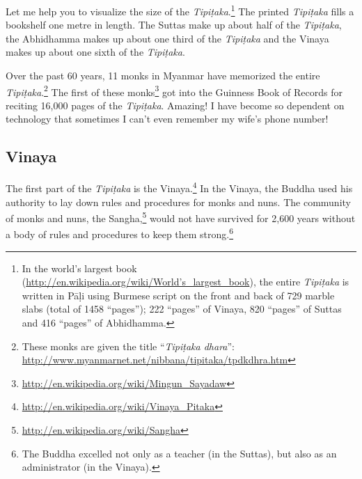 Let me help you to visualize the size of the \textit{Tipiṭaka}.\footnote{In the world’s largest book (\url{http://en.wikipedia.org/wiki/World’s_largest_book}), the entire \textit{Tipiṭaka} is written in Pāḷi using Burmese script on the front and back of 729 marble slabs (total of 1458 “pages”); 222 “pages” of Vinaya, 820 “pages” of Suttas and 416 “pages” of Abhidhamma.} The printed \textit{Tipiṭaka} fills a bookshelf one metre in length. The Suttas make up about half of the \textit{Tipiṭaka}, the Abhidhamma makes up about one third of the \textit{Tipiṭaka} and the Vinaya makes up about one sixth of the \textit{Tipiṭaka}.

\pagebreak

Over the past 60 years, 11 monks in Myanmar have memorized the entire \textit{Tipiṭaka}.\footnote{These monks are given the title “\textit{Tipiṭaka dhara}”: \url {http://www.myanmarnet.net/nibbana/tipitaka/tpdkdhra.htm}} The first of these monks\footnote{\url{http://en.wikipedia.org/wiki/Mingun_Sayadaw}} got into the Guinness Book of Records for reciting 16,000 pages of the \textit{Tipiṭaka}. Amazing! I have become so dependent on technology that sometimes I can’t even remember my wife’s phone number!

\subsection*{Vinaya}

The first part of the \textit{Tipiṭaka} is the Vinaya.\footnote{\url{http://en.wikipedia.org/wiki/Vinaya_Pitaka}} In the Vinaya, the Buddha used his authority to lay down rules and procedures for monks and nuns. The community of monks and nuns, the Sangha,\footnote{\url{http://en.wikipedia.org/wiki/Sangha}} would not have survived for 2,600 years without a body of rules and procedures to keep them strong.\footnote{The Buddha excelled not only as a teacher (in the Suttas), but also as an administrator (in the Vinaya).}

